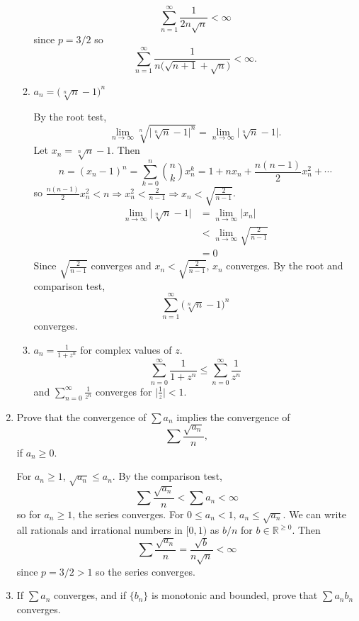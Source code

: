 \begin{enumerate}
\begin{enumerate}[label = (\alph*)]
\[    \sum_{n = 1}^{\infty}\frac{1}{2n\sqrt{n}} < \infty
    \]
    since \(p = 3/2\) so
    \[
    \sum_{n = 1}^{\infty}\frac{1}{n\bigl(\sqrt{n + 1} + \sqrt{n}\bigr)} <
    \infty.
    \]
  \item
    \(a_n = \bigl(\sqrt[n]{n} - 1\bigr)^n\)
    \par\smallskip
    By the root test,
    \[
    \lim_{n\to\infty}\sqrt[n]{\lvert\sqrt[n]{n} - 1\rvert^n} =
    \lim_{n\to\infty}\lvert\sqrt[n]{n} - 1\rvert.
    \]
    Let \(x_n = \sqrt[n]{n} - 1\).
    Then
    \[
    n = (x_n - 1)^n = \sum_{k = 0}^n\binom{n}{k}x_n^k = 1 + nx_n +
    \frac{n(n-1)}{2}x_n^2 + \cdots
    \]
    so \(\frac{n(n-1)}{2}x_n^2 < n\Rightarrow x_n^2 < \frac{2}{n - 1}
    \Rightarrow x_n < \sqrt{\frac{2}{n - 1}}\).
    \begin{align*}
      \lim_{n\to\infty}\lvert\sqrt[n]{n} - 1\rvert
      & = \lim_{n\to\infty}\lvert x_n\rvert\\
      & < \lim_{n\to\infty}\sqrt{\frac{2}{n - 1}}\\
      & = 0
    \end{align*}
    Since \(\sqrt{\frac{2}{n - 1}}\) converges and
    \(x_n < \sqrt{\frac{2}{n - 1}}\), \(x_n\) converges.
    By the root and comparison test,
    \[
    \sum_{n = 1}^{\infty}\bigl(\sqrt[n]{n} - 1\bigr)^n
    \]
    converges.
  \item
    \(a_n = \frac{1}{1 + z^n}\) for complex values of \(z\).
    \[
    \sum_{n = 0}^{\infty}\frac{1}{1 + z^n}\leq
    \sum_{n = 0}^{\infty}\frac{1}{z^n}
    \]
    and \(\sum_{n = 0}^{\infty}\frac{1}{z^n}\) converges for
    \(\bigl\lvert\frac{1}{z}\bigr\rvert < 1\).
  \end{enumerate}
\item
  Prove that the convergence of \(\sum a_n\) implies the convergence of
  \[
  \sum\frac{\sqrt{a_n}}{n},
  \]
  if \(a_n\geq 0\).
  \par\smallskip
  For \(a_n\geq 1\), \(\sqrt{a_n}\leq a_n\).
  By the comparison test,
  \[
  \sum\frac{\sqrt{a_n}}{n} < \sum a_n < \infty
  \]
  so for \(a_n\geq 1\), the series converges.
  For \(0\leq a_n < 1\), \(a_n\leq\sqrt{a_n}\).
  We can write all rationals and irrational numbers in \([0,1)\) as \(b/n\)
  for \(b\in\mathbb{R}^{\geq 0}\).
  Then
  \[
  \sum\frac{\sqrt{a_n}}{n} = \frac{\sqrt{b}}{n\sqrt{n}} < \infty
  \]
  since \(p = 3/2 > 1\) so the series converges.
\item
  If \(\sum a_n\) converges, and if \(\{b_n\}\) is monotonic and bounded,
  prove that \(\sum a_nb_n\) converges.
  \par\smallskip

\end{enumerate}
